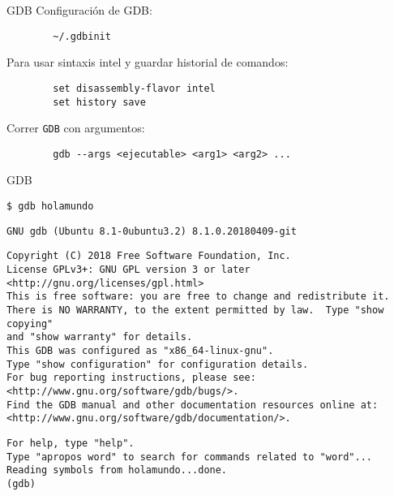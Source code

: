 \documentclass[aspectratio=169]{beamer}
\begin{document}
\begin{frame}[fragile]{GDB}
    Configuración de GDB:\\
    \vspace{0.1cm}
    \begin{verbatim}
        ~/.gdbinit 
    \end{verbatim}
    \vspace{0.4cm}
    Para usar sintaxis intel y guardar historial de comandos:\\
    \vspace{0.1cm}
    \begin{verbatim}
        set disassembly-flavor intel
        set history save
    \end{verbatim}
    \vspace{0.4cm}
    Correr \texttt{GDB} con argumentos:
    \vspace{0.1cm}
    \begin{verbatim}
        gdb --args <ejecutable> <arg1> <arg2> ...
    \end{verbatim}
\end{frame}

\begin{frame}[fragile,t]{GDB}
\small
\begin{verbatim}
$ gdb holamundo 
\end{verbatim}
\pause
\begin{verbatim}
GNU gdb (Ubuntu 8.1-0ubuntu3.2) 8.1.0.20180409-git
\end{verbatim}
\scriptsize
\vspace{-0.5cm}
\begin{verbatim}
Copyright (C) 2018 Free Software Foundation, Inc.
License GPLv3+: GNU GPL version 3 or later <http://gnu.org/licenses/gpl.html>
This is free software: you are free to change and redistribute it.
There is NO WARRANTY, to the extent permitted by law.  Type "show copying"
and "show warranty" for details.
This GDB was configured as "x86_64-linux-gnu".
Type "show configuration" for configuration details.
For bug reporting instructions, please see:
<http://www.gnu.org/software/gdb/bugs/>.
Find the GDB manual and other documentation resources online at:
<http://www.gnu.org/software/gdb/documentation/>.
\end{verbatim}
\small
\vspace{-0.5cm}
\begin{verbatim}
For help, type "help".
Type "apropos word" to search for commands related to "word"...
Reading symbols from holamundo...done.
(gdb) 
\end{verbatim}
\end{frame}
\end{document}

